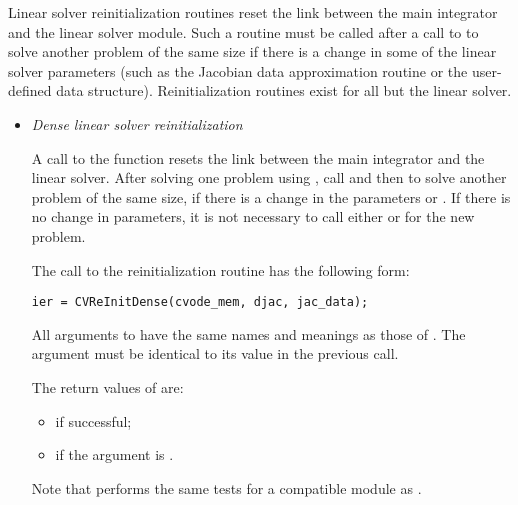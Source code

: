 Linear solver reinitialization routines reset the link between the main {\cvodes}
integrator and the linear solver module. Such a routine must be called after a call
to  to solve another problem of the same size if there is a change
in some of the linear solver parameters (such as the Jacobian data approximation
routine or the user-defined data structure). Reinitialization routines exist for
all but the {\cvdiag} linear solver.

\begin{itemize}

\item {\em Dense linear solver reinitialization} 

  A call to the  function resets the link between   
  the main {\cvodes} integrator and the {\cvdense} linear solver.       
  After solving one problem using {\cvdense}, call  and then
   to solve another problem of the same size, if    
  there is a change in the  parameters  or .  
  If there is no change in parameters, it is not necessary to    
  call either  or  for the new problem.  

  The call to the {\cvdense} reinitialization routine has the following form:
\begin{verbatim}
ier = CVReInitDense(cvode_mem, djac, jac_data);
\end{verbatim}
  All arguments to  have the same names and meanings
  as those of .  The  argument must be identical 
  to its value in the previous  call.                     
  
  The return values of  are:
  \begin{itemize}
  \item {} if successful;
  \item {} if the  argument is .
  \end{itemize}         
  
  Note that  performs the same tests for a compatible {\nvector} 
  module as .
  

\end{itemize}
